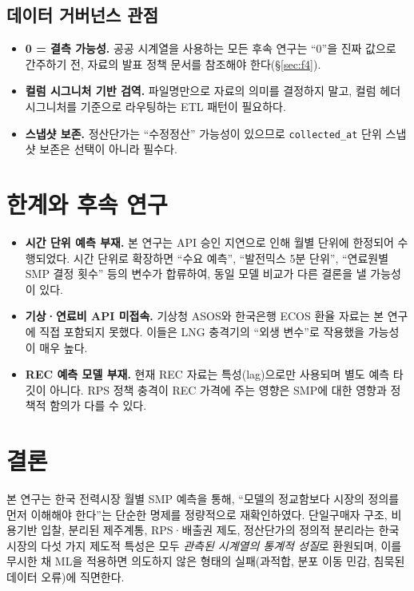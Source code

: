 \documentclass[11pt,a4paper]{article}
\begin{document}
\subsection{데이터 거버넌스 관점}

\begin{itemize}[leftmargin=1.5em]
  \item \textbf{0 = 결측 가능성.} 공공 시계열을 사용하는 모든 후속
        연구는 ``0''을 진짜 값으로 간주하기 전, 자료의 발표 정책
        문서를 참조해야 한다(\S\ref{sec:f4}).
  \item \textbf{컬럼 시그니처 기반 검역.} 파일명만으로 자료의 의미를
        결정하지 말고, 컬럼 헤더 시그니처를 기준으로 라우팅하는
        ETL 패턴이 필요하다.
  \item \textbf{스냅샷 보존.} 정산단가는 ``수정정산'' 가능성이 있으므로
        \texttt{collected\_at} 단위 스냅샷 보존은 선택이 아니라 필수다.
\end{itemize}

\section{한계와 후속 연구}
\label{sec:limits}

\begin{itemize}[leftmargin=1.5em]
  \item \textbf{시간 단위 예측 부재.} 본 연구는 API 승인 지연으로 인해
        월별 단위에 한정되어 수행되었다. 시간 단위로 확장하면
        ``수요 예측'', ``발전믹스 5분 단위'', ``연료원별 SMP 결정 횟수''
        등의 변수가 합류하여, 동일 모델 비교가 다른 결론을 낼
        가능성이 있다.
  \item \textbf{기상·연료비 API 미접속.} 기상청 ASOS와 한국은행 ECOS
        환율 자료는 본 연구에 직접 포함되지 못했다. 이들은 LNG 충격기의
        ``외생 변수''로 작용했을 가능성이 매우 높다.
  \item \textbf{REC 예측 모델 부재.} 현재 REC 자료는 특성(lag)으로만
        사용되며 별도 예측 타깃이 아니다. RPS 정책 충격이 REC 가격에
        주는 영향은 SMP에 대한 영향과 정책적 함의가 다를 수 있다.
\end{itemize}

\section{결론}
\label{sec:conclusion}

본 연구는 한국 전력시장 월별 SMP 예측을 통해, ``모델의 정교함보다
시장의 정의를 먼저 이해해야 한다''는 단순한 명제를 정량적으로
재확인하였다. 단일구매자 구조, 비용기반 입찰, 분리된 제주계통,
RPS·배출권 제도, 정산단가의 정의적 분리라는 한국 시장의 다섯 가지
제도적 특성은 모두 \emph{관측된 시계열의 통계적 성질}로 환원되며,
이를 무시한 채 ML을 적용하면 의도하지 않은 형태의
실패(과적합, 분포 이동 민감, 침묵된 데이터 오류)에 직면한다.
\end{document}
